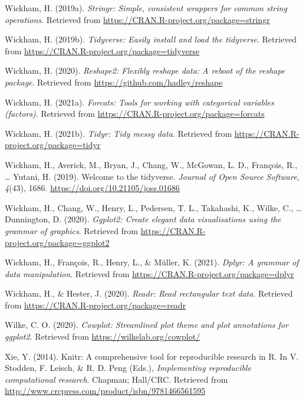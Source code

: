 \documentclass[
]{article}
\begin{document}
\leavevmode\hypertarget{ref-R-stringr}{}%
Wickham, H. (2019a). \emph{Stringr: Simple, consistent wrappers for
common string operations}. Retrieved from
\url{https://CRAN.R-project.org/package=stringr}

\leavevmode\hypertarget{ref-R-tidyverse}{}%
Wickham, H. (2019b). \emph{Tidyverse: Easily install and load the
tidyverse}. Retrieved from
\url{https://CRAN.R-project.org/package=tidyverse}

\leavevmode\hypertarget{ref-R-reshape2}{}%
Wickham, H. (2020). \emph{Reshape2: Flexibly reshape data: A reboot of
the reshape package}. Retrieved from
\url{https://github.com/hadley/reshape}

\leavevmode\hypertarget{ref-R-forcats}{}%
Wickham, H. (2021a). \emph{Forcats: Tools for working with categorical
variables (factors)}. Retrieved from
\url{https://CRAN.R-project.org/package=forcats}

\leavevmode\hypertarget{ref-R-tidyr}{}%
Wickham, H. (2021b). \emph{Tidyr: Tidy messy data}. Retrieved from
\url{https://CRAN.R-project.org/package=tidyr}

\leavevmode\hypertarget{ref-tidyverse2019}{}%
Wickham, H., Averick, M., Bryan, J., Chang, W., McGowan, L. D.,
François, R., \ldots{} Yutani, H. (2019). Welcome to the tidyverse.
\emph{Journal of Open Source Software}, \emph{4}(43), 1686.
\url{https://doi.org/10.21105/joss.01686}

\leavevmode\hypertarget{ref-R-ggplot2}{}%
Wickham, H., Chang, W., Henry, L., Pedersen, T. L., Takahashi, K.,
Wilke, C., \ldots{} Dunnington, D. (2020). \emph{Ggplot2: Create elegant
data visualisations using the grammar of graphics}. Retrieved from
\url{https://CRAN.R-project.org/package=ggplot2}

\leavevmode\hypertarget{ref-R-dplyr}{}%
Wickham, H., François, R., Henry, L., \& Müller, K. (2021). \emph{Dplyr:
A grammar of data manipulation}. Retrieved from
\url{https://CRAN.R-project.org/package=dplyr}

\leavevmode\hypertarget{ref-R-readr}{}%
Wickham, H., \& Hester, J. (2020). \emph{Readr: Read rectangular text
data}. Retrieved from \url{https://CRAN.R-project.org/package=readr}

\leavevmode\hypertarget{ref-R-cowplot}{}%
Wilke, C. O. (2020). \emph{Cowplot: Streamlined plot theme and plot
annotations for ggplot2}. Retrieved from
\url{https://wilkelab.org/cowplot/}

\leavevmode\hypertarget{ref-knitr2014}{}%
Xie, Y. (2014). Knitr: A comprehensive tool for reproducible research in
R. In V. Stodden, F. Leisch, \& R. D. Peng (Eds.), \emph{Implementing
reproducible computational research}. Chapman; Hall/CRC. Retrieved from
\url{http://www.crcpress.com/product/isbn/9781466561595}
\end{document}
